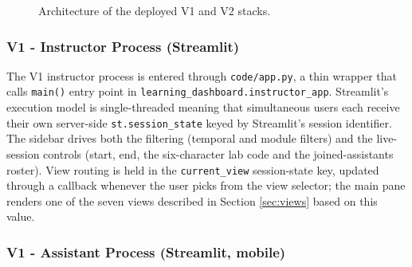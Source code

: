 \begin{figure}[H]
{}
    \caption{Architecture of the deployed V1 and V2 stacks.}
    \label{fig:arch-v2}
\end{figure}

\subsubsection{V1 - Instructor Process (Streamlit)} 

The V1 instructor process is entered through \texttt{code/app.py}, a thin wrapper that calls \texttt{main()} entry point in \texttt{learning\_dashboard.instructor\_app}. 
Streamlit's execution model is single-threaded meaning that simultaneous users each receive their own server-side \texttt{st.session\_state} keyed by Streamlit's session identifier.
The sidebar drives both the filtering (temporal and module filters) and the live-session controls (start, end, the six-character lab code and the joined-assistants roster). 
View routing is held in the \texttt{current\_view} session-state key, updated through a callback whenever the user picks from the view selector; the main pane renders one of the seven views described in Section \ref{sec:views} based on this value.


\subsubsection{V1 - Assistant Process (Streamlit, mobile)} 


